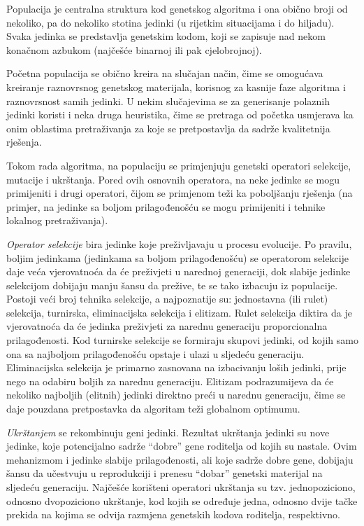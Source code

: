 \documentclass[a4paper, utf8, 11pt, colorlinks]{book}
\begin{document}
Populacija je centralna struktura kod genetskog algoritma i ona  obično broji od nekoliko, pa do nekoliko stotina jedinki (u rijetkim situacijama i do hiljadu). Svaka jedinka se predstavlja genetskim kodom, koji se zapisuje nad nekom konačnom azbukom (najčešće binarnoj ili pak cjelobrojnoj).


Početna populacija se obično kreira na slučajan način, čime se omogućava kreiranje raznovrsnog genetskog materijala, korisnog za kasnije faze algoritma i raznovrsnost samih jedinki. U nekim slučajevima se za generisanje polaznih jedinki koristi i neka druga heuristika, čime se pretraga od početka usmjerava ka onim oblastima pretraživanja za koje se pretpostavlja da sadrže kvalitetnija rješenja.

Tokom rada algoritma, na populaciju se primjenjuju genetski operatori selekcije, mutacije i ukrštanja. Pored ovih osnovnih operatora, na neke jedinke se mogu primijeniti i drugi operatori, čijom se primjenom teži ka poboljšanju rješenja (na primjer, na jedinke sa boljom prilagođenošću se mogu primijeniti i tehnike lokalnog  pretraživanja).

\emph{Operator selekcije} bira jedinke koje preživljavaju u procesu evolucije. Po pravilu, boljim jedinkama (jedinkama sa boljom prilagođenošću) se operatorom selekcije daje veća vjerovatnoća da će preživjeti u narednoj generaciji, dok  slabije jedinke selekcijom dobijaju manju šansu da prežive, te se tako izbacuju iz populacije. Postoji veći broj tehnika selekcije, a najpoznatije su: jednostavna (ili rulet) selekcija, turnirska, eliminacijska selekcija i elitizam. Rulet selekcija diktira da je vjerovatnoća da će jedinka preživjeti za narednu generaciju proporcionalna prilagođenosti. Kod turnirske selekcije se formiraju skupovi jedinki, od kojih samo ona sa najboljom prilagođenošću opstaje i ulazi u sljedeću generaciju. Eliminacijska selekcija je primarno zasnovana na izbacivanju loših jedinki, prije nego na odabiru boljih za narednu generaciju. Elitizam podrazumijeva da će nekoliko najboljih (elitnih) jedinki direktno preći u narednu generaciju, čime se daje pouzdana pretpostavka da  algoritam teži globalnom optimumu.

\emph{Ukrštanjem} se rekombinuju geni jedinki. Rezultat ukrštanja jedinki su nove jedinke, koje potencijalno sadrže ``dobre'' gene  roditelja od kojih su nastale. Ovim mehanizmom  i jedinke slabije prilagođenosti, ali koje sadrže dobre gene, dobijaju šansu da učestvuju u reprodukciji i prenesu ``dobar'' genetski materijal na sljedeću generaciju. Najčešće korišteni operatori ukrštanja su tzv. jednopoziciono, odnosno dvopoziciono ukrštanje, kod kojih se određuje jedna, odnosno dvije tačke prekida na kojima se odvija razmjena genetskih kodova roditelja, respektivno.
\end{document}
